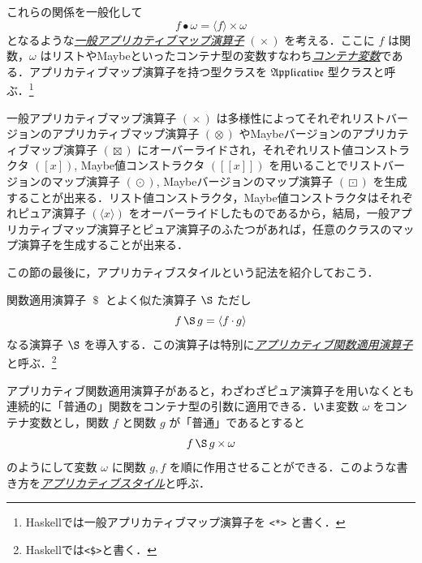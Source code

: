 \documentclass[a4paper]{jsbook}
\def\[{\left[\!\left[}
\def\]{\right]\!\right]}
\newcommand{\programminglanguage}[1]{\textsf{#1}}
\newcommand{\haskell}{\programminglanguage{Haskell}}
\newcommand{\keyword}[1]{{\underline{\emph{#1}}}}
\newcommand{\code}[1]{\texttt{#1}}
\newcommand{\mSpecialTypeClass}[1]{\mathfrak{#1}} %
\newcommand{\mApplicativeTypeClass}{\mSpecialTypeClass{Applicative}}
\newcommand{\mListWith}[1]{\left[#1\right]}
\newcommand{\mMaybeWith}[1]{\[#1\]}
\newcommand{\mPureWith}[1]{\langle#1\rangle}
\DeclareMathOperator{\mComp}{\cdot}
\DeclareMathOperator{\mApply}{\$}
\DeclareMathOperator{\mMap}{\bullet}
\DeclareMathOperator{\mMapList}{\odot}
\DeclareMathOperator{\mMapMaybe}{\boxdot}
\DeclareMathOperator{\mApplicativeApply}{\S}
\DeclareMathOperator{\mApplicativeMap}{\times}
\DeclareMathOperator{\mApplicativeMapList}{\otimes}
\DeclareMathOperator{\mApplicativeMapMaybe}{\boxtimes}
\begin{document}
これらの関係を一般化して
\begin{equation}
f\mMap\omega=\mPureWith{f}\mApplicativeMap\omega
\end{equation}
となるような\keyword{一般アプリカティブマップ演算子} $(\mApplicativeMap)$ を考える．ここに $f$ は関数，$\omega$ はリストやMaybeといったコンテナ型の変数すなわち\keyword{コンテナ変数}である．アプリカティブマップ演算子を持つ型クラスを $\mApplicativeTypeClass$ 型クラスと呼ぶ．\footnote{\haskell では一般アプリカティブマップ演算子を \code{<*>} と書く．}


一般アプリカティブマップ演算子 $(\mApplicativeMap)$ は多様性によってそれぞれリストバージョンのアプリカティブマップ演算子 $(\mApplicativeMapList)$ やMaybeバージョンのアプリカティブマップ演算子 $(\mApplicativeMapMaybe)$ にオーバーライドされ，それぞれリスト値コンストラクタ $(\mListWith{x})$, Maybe値コンストラクタ $(\mMaybeWith{x})$ を用いることでリストバージョンのマップ演算子 $(\mMapList)$, Maybeバージョンのマップ演算子 $(\mMapMaybe)$ を生成することが出来る．リスト値コンストラクタ，Maybe値コンストラクタはそれぞれピュア演算子 $(\mPureWith{x})$ をオーバーライドしたものであるから，結局，一般アプリカティブマップ演算子とピュア演算子のふたつがあれば，任意のクラスのマップ演算子を生成することが出来る．




この節の最後に，アプリカティブスタイルという記法を紹介しておこう．

関数適用演算子 $\mApply$ とよく似た演算子 $\mApplicativeApply$ ただし
\begin{equation}
f\mApplicativeApply g=\mPureWith{f\mComp g}
\end{equation}
なる演算子 $\mApplicativeApply$ を導入する．この演算子は特別に\keyword{アプリカティブ関数適用演算子}と呼ぶ．\footnote{\haskell では\code{<\$>}と書く．}

アプリカティブ関数適用演算子があると，わざわざピュア演算子を用いなくとも連続的に「普通の」関数をコンテナ型の引数に適用できる．いま変数 $\omega$ をコンテナ変数とし，関数 $f$ と関数 $g$ が「普通」であるとすると
\begin{equation}
f\mApplicativeApply g\mApplicativeMap\omega
\end{equation}
のようにして変数 $\omega$ に関数 $g,f$ を順に作用させることができる．このような書き方を\keyword{アプリカティブスタイル}と呼ぶ．
\end{document}
